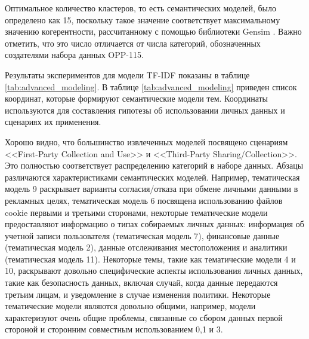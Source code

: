 \documentclass[../main]{subfiles}
\begin{document}
Оптимальное количество кластеров, то есть семантических моделей, было определено как 15, поскольку такое значение соответствует максимальному значению когерентности, рассчитанному с помощью библиотеки Gensim \cite{MDPI13}. Важно отметить, что это число отличается от числа категорий, обозначенных создателями набора данных OPP-115.

Результаты экспериментов для модели TF-IDF показаны в таблице \ref{tab:advanced_modeling}. В таблице \ref{tab:advanced_modeling} приведен список координат, которые формируют семантические модели тем. Координаты используются для составления гипотезы об использовании личных данных и сценариях их применения.

Хорошо видно, что большинство извлеченных моделей посвящено сценариям <<First-Party Collection and Use>> и <<Third-Party Sharing/Collection>>. Это полностью соответствует распределению категорий в наборе данных. Абзацы различаются характеристиками семантических моделей. Например, тематическая модель 9 раскрывает варианты согласия/отказа при обмене личными данными в рекламных целях, тематическая модель 6 посвящена использованию файлов cookie первыми и третьими сторонами, некоторые тематические модели предоставляют информацию о типах собираемых личных данных: информация об учетной записи пользователя (тематическая модель 7), финансовые данные (тематическая модель 2), данные отслеживания местоположения и аналитики (тематическая модель 11). Некоторые темы, такие как тематические модели 4 и 10, раскрывают довольно специфические аспекты использования личных данных, такие как безопасность данных, включая случай, когда данные передаются третьим лицам, и уведомление в случае изменения политики. Некоторые тематические модели являются довольно общими, например, модели характеризуют очень общие проблемы, связанные со сбором данных первой стороной и сторонним совместным использованием 0,1 и 3.
\end{document}
